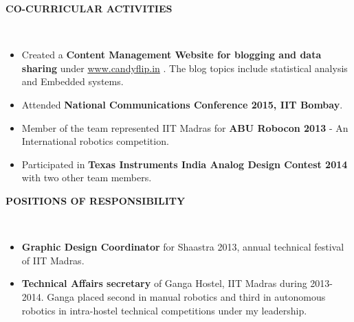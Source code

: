 \documentclass[a4paper,10pt]{article}
\newcommand{\lsep}{-0.5cm}
\newcommand{\resheading}[1]{{\small \colorbox{mygrey}{\begin{minipage}{0.975\textwidth}{\textbf{#1 \vphantom{p\^{E}}}}\end{minipage}}}}
\begin{document}
\resheading{\textbf{CO-CURRICULAR ACTIVITIES} }\\[\lsep]
\begin{itemize}
    \item Created a \textbf{Content Management Website for blogging and data sharing} under \hspace{3pt}\url{www.candyflip.in} . The blog topics include statistical analysis and Embedded systems.
          \vspace{-5pt}
    \item Attended \textbf{National Communications Conference 2015, IIT Bombay}.
          \vspace{-5pt}
    \item Member of the team represented IIT Madras for \textbf{ABU Robocon 2013} - An International robotics competition.
          \vspace{-5pt}
    \item Participated in \textbf{Texas Instruments India Analog Design Contest 2014} with two other team members.
\end{itemize}

\resheading{\textbf{POSITIONS OF RESPONSIBILITY} }\\[\lsep]
\begin{itemize}
    \vspace{3pt}
    \item \textbf{Graphic Design Coordinator} for Shaastra 2013, annual technical festival of
          IIT Madras.
          \vspace{-5pt}
    \item \textbf{Technical Affairs secretary} of Ganga Hostel, IIT Madras during 2013-2014. Ganga placed second in manual robotics and third in autonomous robotics in intra-hostel technical competitions under my leadership.
\end{itemize}
\end{document}
